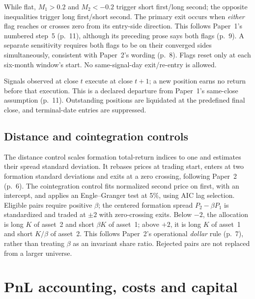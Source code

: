 While flat, $M_1>0.2$ and $M_2<-0.2$ trigger short first/long second; the
opposite inequalities trigger long first/short second. The primary exit occurs
when \emph{either} flag reaches or crosses zero from its entry-side direction.
This follows Paper~1's numbered step~5 (p.~11), although its preceding prose
says both flags (p.~9). A separate sensitivity requires both flags to be on
their converged sides simultaneously, consistent with Paper~2's wording
(p.~8). Flags reset only at each six-month window's start. No same-signal-day
exit/re-entry is allowed.

Signals observed at close $t$ execute at close $t+1$; a new position earns no
return before that execution. This is a declared departure from Paper~1's
same-close assumption (p.~11). Outstanding positions are liquidated at the
predefined final close, and terminal-date entries are suppressed.

\subsection{Distance and cointegration controls}

The distance control scales formation total-return indices to one and estimates
their spread standard deviation. It rebases prices at trading start, enters at
two formation standard deviations and exits at a zero crossing, following
Paper~2 (p.~6). The cointegration control fits normalized second price on first,
with an intercept, and applies an Engle--Granger test at 5\%, using AIC lag
selection. Eligible pairs require positive $\beta$; the centered formation spread
$P_2-\beta P_1$ is standardized and traded at $\pm2$ with zero-crossing exits.
Below $-2$, the allocation is long $K$ of asset~2 and short $\beta K$ of asset~1;
above $+2$, it is long $K$ of asset~1 and short $K/\beta$ of asset~2. This follows
Paper~2's operational \emph{dollar} rule (p.~7), rather than treating $\beta$ as
an invariant share ratio. Rejected pairs are not replaced from a larger universe.

\section{PnL accounting, costs and capital}

